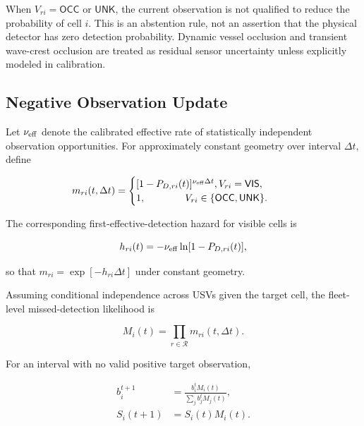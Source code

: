 \documentclass[conference]{IEEEtran}
\begin{document}
When $V_{ri}=\mathsf{OCC}$ or $\mathsf{UNK}$, the current observation is not
qualified to reduce the probability of cell $i$. This is an abstention rule,
not an assertion that the physical detector has zero detection probability.
Dynamic vessel occlusion and transient wave-crest occlusion are treated as
residual sensor uncertainty unless explicitly modeled in calibration.

\subsection{Negative Observation Update}

Let $\nu_{\rm eff}$ denote the calibrated effective rate of statistically
independent observation opportunities. For approximately constant geometry
over interval $\Delta t$, define

\begin{equation}
\hspace{-0.8em}
\begin{aligned}
m_{ri}(t,\Delta t)
&=
\begin{cases}
[1-P_{D,ri}(t)]^{\nu_{\rm eff}\Delta t},
V_{ri}=\mathsf{VIS},\\
1,\hspace{40px}
V_{ri}\in\{\mathsf{OCC},\mathsf{UNK}\}.
\end{cases}
\end{aligned}
\label{eq:interval_miss}
\end{equation}

The corresponding first-effective-detection hazard for visible cells is

\begin{equation}
h_{ri}(t)=-\nu_{\rm eff}\ln[1-P_{D,ri}(t)],
\label{eq:detection_hazard}
\end{equation}

so that $m_{ri}=\exp[-h_{ri}\Delta t]$ under constant geometry.

Assuming conditional independence across USVs given the target cell, the
fleet-level missed-detection likelihood is

\begin{equation}
M_i(t)=\prod_{r\in\mathcal{R}}m_{ri}(t,\Delta t).
\label{eq:fleet_miss}
\end{equation}

For an interval with no valid positive target observation,

\begin{equation}
\begin{aligned}
b_i^{t+1}
&=\frac{b_i^tM_i(t)}{\sum_j b_j^tM_j(t)},\\
S_i(t+1)&=S_i(t)M_i(t).
\end{aligned}
\label{eq:negative_update}
\end{equation}
\end{document}
